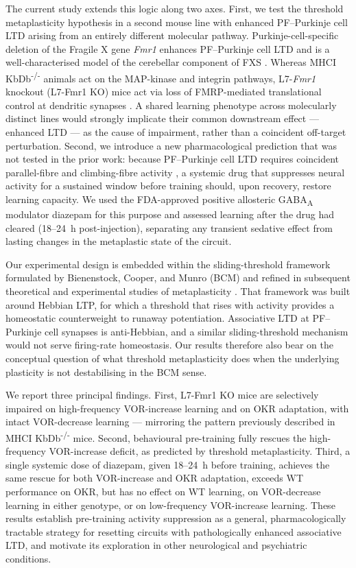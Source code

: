 \documentclass[11pt]{article}
\begin{document}
The current study extends this logic along two axes. First, we test the
threshold metaplasticity hypothesis in a second mouse line with enhanced
PF--Purkinje cell LTD arising from an entirely different molecular pathway.
Purkinje-cell-specific deletion of the Fragile X gene \textit{Fmr1} enhances
PF--Purkinje cell LTD and is a well-characterised model of the cerebellar
component of FXS \citep{koekkoek2005fmr1, mientjes2006conditional,
zhang2004l7cre, nosyreva2006fmr1}. Whereas MHCI KbDb\textsuperscript{-/-}
animals act on the MAP-kinase and integrin pathways, L7-\textit{Fmr1}
knockout (L7-Fmr1 KO) mice act via loss of FMRP-mediated translational
control at dendritic synapses \citep{koekkoek2005fmr1, nosyreva2006fmr1}.
A shared learning phenotype across molecularly distinct lines would strongly
implicate their common downstream effect --- enhanced LTD --- as the cause
of impairment, rather than a coincident off-target perturbation. Second,
we introduce a new pharmacological prediction that was not tested in the
prior work: because PF--Purkinje cell LTD requires coincident parallel-fibre
and climbing-fibre activity \citep{levram2003reversing}, a systemic drug
that suppresses neural activity for a sustained window before training
should, upon recovery, restore learning capacity. We used the
FDA-approved positive allosteric GABA\textsubscript{A} modulator diazepam
for this purpose and assessed learning after the drug had cleared
(18--24~h post-injection), separating any transient sedative effect from
lasting changes in the metaplastic state of the circuit.

Our experimental design is embedded within the sliding-threshold framework
formulated by Bienenstock, Cooper, and Munro (BCM) and refined in
subsequent theoretical and experimental studies of metaplasticity
\citep{abraham1996metaplasticity}. That framework was built around Hebbian
LTP, for which a threshold that rises with activity provides a homeostatic
counterweight to runaway potentiation. Associative LTD at PF--Purkinje
cell synapses is anti-Hebbian, and a similar sliding-threshold mechanism
would not serve firing-rate homeostasis. Our results therefore also bear
on the conceptual question of what threshold metaplasticity does when the
underlying plasticity is not destabilising in the BCM sense.

We report three principal findings. First, L7-Fmr1 KO mice are selectively
impaired on high-frequency VOR-increase learning and on OKR adaptation,
with intact VOR-decrease learning --- mirroring the pattern previously
described in MHCI KbDb\textsuperscript{-/-} mice. Second, behavioural
pre-training fully rescues the high-frequency VOR-increase deficit, as
predicted by threshold metaplasticity. Third, a single systemic dose of
diazepam, given 18--24~h before training, achieves the same rescue for both
VOR-increase and OKR adaptation, exceeds WT performance on OKR, but has no
effect on WT learning, on VOR-decrease learning in either genotype, or on
low-frequency VOR-increase learning. These results establish pre-training
activity suppression as a general, pharmacologically tractable strategy
for resetting circuits with pathologically enhanced associative LTD, and
motivate its exploration in other neurological and psychiatric conditions.
\end{document}
